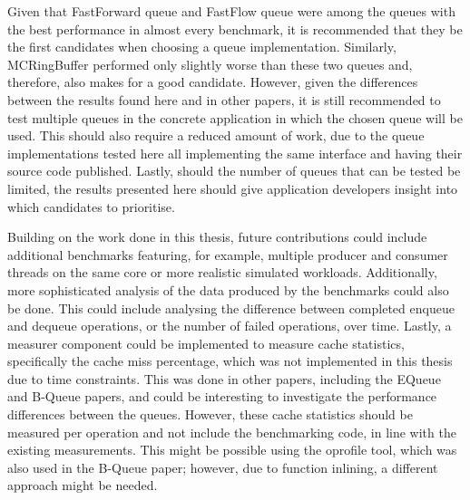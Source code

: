 Given that FastForward queue and FastFlow queue were among the queues with the best performance in almost
every benchmark, it is recommended that they be the first candidates when choosing a queue implementation.
Similarly, MCRingBuffer performed only slightly worse than these two queues and, therefore, also makes for a
good candidate.
However, given the differences between the results found here and in other papers, it is still recommended to
test multiple queues in the concrete application in which the chosen queue will be used.
This should also require a reduced amount of work, due to the queue implementations tested here all
implementing the same interface and having their source code published.
Lastly, should the number of queues that can be tested be limited, the results presented here should give
application developers insight into which candidates to prioritise.

Building on the work done in this thesis, future contributions could include additional benchmarks featuring,
for example, multiple producer and consumer threads on the same core or more realistic simulated workloads.
Additionally, more sophisticated analysis of the data produced by the benchmarks could also be done.
This could include analysing the difference between completed enqueue and dequeue operations, or the number
of failed operations, over time.
Lastly, a measurer component could be implemented to measure cache statistics, specifically the cache miss
percentage, which was not implemented in this thesis due to time constraints.
This was done in other papers, including the EQueue and B-Queue papers, and could be interesting to
investigate the performance differences between the queues.
However, these cache statistics should be measured per operation and not include the benchmarking code,
in line with the existing measurements.
This might be possible using the oprofile tool, which was also used in the B-Queue paper; however, due to function
inlining, a different approach might be needed.
